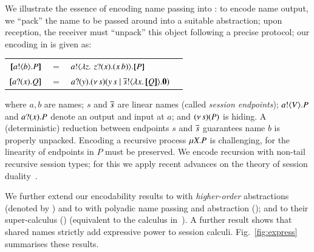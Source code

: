 We illustrate the essence of encoding name passing into \HO: 
to encode name output, we ``pack''
the name to be passed around into a suitable abstraction; 
upon reception, the receiver must ``unpack'' this object following a precise protocol; our encoding 
in \HO is given as:
\begin{center}
\begin{tabular}{rcll}
  $[\!\![a ! \langle b \rangle . P]\!\!]$	&$=$&	$a ! \langle  \lambda z.\,\,z ? (x) . (x\, {b})  \rangle . [\!\![P]\!\!]$ \\
  $[\!\![a ? (x) . Q]\!\!]$	&$=$&	$a ? (y) . (\nu\, s)(y\, {s} \;|\; \overline{s} ! \langle \lambda x.\,[\!\![Q]\!\!] \rangle . \mathbf{0})$
\end{tabular}
\end{center}
\noi where $a,b$ are names; $s$ and $\overline{s}$ are 
linear names (called \emph{session endpoints});
$a ! \langle V \rangle . P$ and 
$a ? (x) . P$ denote an output and input at $a$;   
and $(\nu\, s)(P)$ is hiding. 
A (deterministic) reduction between   endpoints 
$s$ and $\overline{s}$ guarantees name $b$ is properly unpacked.
Encoding a recursive process $\mu X. P$ is  challenging, for 
the linearity of endpoints in $P$ must be preserved.
We encode recursion with non-tail recursive session types; for this 
we apply recent advances on the theory of session duality~\cite{TGC14,DBLP:journals/corr/abs-1202-2086}.

We further extend our encodability results to 
\HOp with \emph{higher-order} abstractions (denoted by \HOpp) 
and to \HOp with polyadic name passing and abstraction (\pHOp); and to
their super-calculus  (\PHOpp) (equivalent to the calculus in~\cite{tlca07}). 
A further result shows that 
shared names
strictly add expressive power 
to session calculi. 
Fig.~\ref{fig:express} summarises %
these results. %

